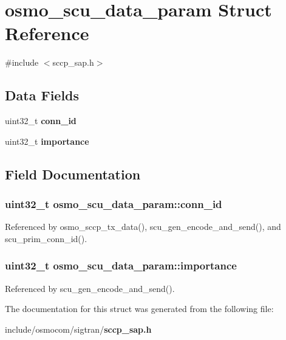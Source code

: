 \section{osmo\+\_\+scu\+\_\+data\+\_\+param Struct Reference}
\label{structosmo__scu__data__param}


{\ttfamily \#include $<$sccp\+\_\+sap.\+h$>$}

\subsection*{Data Fields}
\begin{DoxyCompactItemize}
\item 
uint32\+\_\+t {\bf conn\+\_\+id}
\item 
uint32\+\_\+t {\bf importance}
\end{DoxyCompactItemize}


\subsection{Field Documentation}
\subsubsection[{conn\+\_\+id}]{\setlength{\rightskip}{0pt plus 5cm}uint32\+\_\+t osmo\+\_\+scu\+\_\+data\+\_\+param\+::conn\+\_\+id}\label{structosmo__scu__data__param_afef6dcd4df457e1099a4d9c9c14bdb4f}


Referenced by osmo\+\_\+sccp\+\_\+tx\+\_\+data(), scu\+\_\+gen\+\_\+encode\+\_\+and\+\_\+send(), and scu\+\_\+prim\+\_\+conn\+\_\+id().

\subsubsection[{importance}]{\setlength{\rightskip}{0pt plus 5cm}uint32\+\_\+t osmo\+\_\+scu\+\_\+data\+\_\+param\+::importance}\label{structosmo__scu__data__param_a32ee1895a8adc09b5ef797b046dabbf5}


Referenced by scu\+\_\+gen\+\_\+encode\+\_\+and\+\_\+send().



The documentation for this struct was generated from the following file\+:\begin{DoxyCompactItemize}
\item 
include/osmocom/sigtran/{\bf sccp\+\_\+sap.\+h}\end{DoxyCompactItemize}

